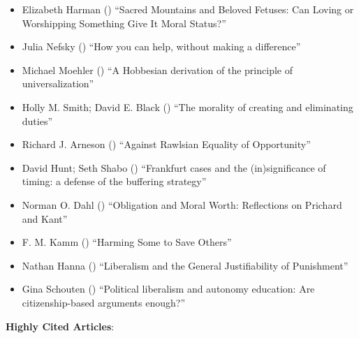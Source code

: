 \documentclass[
  10pt,
  letterpaper,
  DIV=11,
  numbers=noendperiod,
  twoside]{scrartcl}
\providecommand{\tightlist}{%
  \setlength{\itemsep}{0pt}\setlength{\parskip}{0pt}}\usepackage{longtable,booktabs,array}
\begin{document}
\begin{itemize}
\tightlist
\item
  Elizabeth Harman () ``Sacred
  Mountains and Beloved Fetuses: Can Loving or Worshipping Something
  Give It Moral Status?''
\item
  Julia Nefsky () ``How you can
  help, without making a difference''
\item
  Michael Moehler () ``A
  Hobbesian derivation of the principle of universalization''
\item
  Holly M. Smith; David E. Black
  () ``The morality of creating
  and eliminating duties''
\item
  Richard J. Arneson () ``Against
  Rawlsian Equality of Opportunity''
\item
  David Hunt; Seth Shabo ()
  ``Frankfurt cases and the (in)significance of timing: a defense of the
  buffering strategy''
\item
  Norman O. Dahl () ``Obligation
  and Moral Worth: Reflections on Prichard and Kant''
\item
  F. M. Kamm () ``Harming Some to
  Save Others''
\item
  Nathan Hanna () ``Liberalism
  and the General Justifiability of Punishment''
\item
  Gina Schouten () ``Political
  liberalism and autonomy education: Are citizenship-based arguments
  enough?''
\end{itemize}

\textbf{Highly Cited Articles}:
\end{document}
